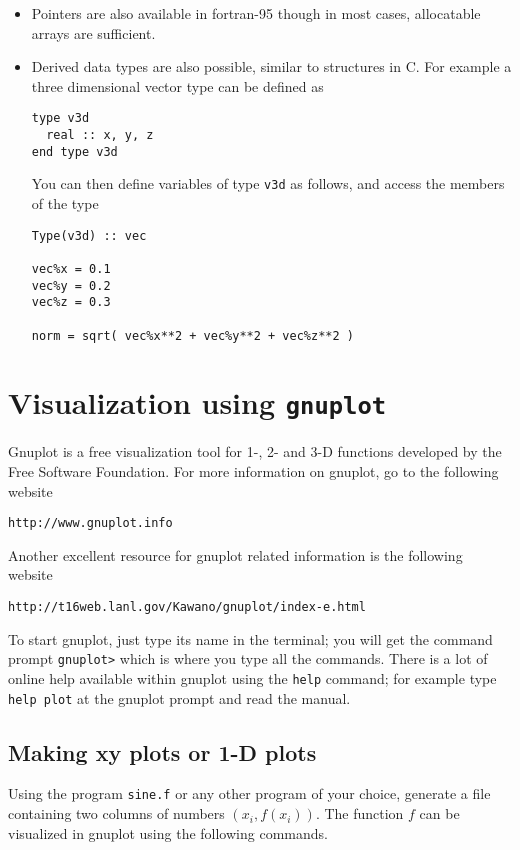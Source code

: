 \documentclass[11pt,oneside]{amsart}
\begin{document}
\begin{itemize}
\item Pointers are also available in fortran-95 though in most cases, allocatable arrays are sufficient.

\item Derived data types are also possible, similar to structures in C. For example a three dimensional vector type can be defined as
\begin{verbatim}
type v3d
  real :: x, y, z
end type v3d
\end{verbatim}
You can then define variables of type {\tt v3d} as follows, and access the members of the type
\begin{verbatim}
Type(v3d) :: vec

vec%x = 0.1
vec%y = 0.2
vec%z = 0.3

norm = sqrt( vec%x**2 + vec%y**2 + vec%z**2 )
\end{verbatim}

\end{itemize}

\section{Visualization using {\tt gnuplot}}
\label{gnu}

Gnuplot is a free visualization tool for 1-, 2- and 3-D functions developed by the Free Software Foundation. For more information on gnuplot, go to the following website

\begin{center}
{\tt http://www.gnuplot.info}
\end{center}
Another excellent resource for gnuplot related information is the following website
\begin{center}
{\tt http://t16web.lanl.gov/Kawano/gnuplot/index-e.html}
\end{center}
To start gnuplot, just type its name in the terminal; you will get the command prompt {\tt gnuplot>} which is where you type all the commands. There is a lot of online help available within gnuplot using the {\tt help} command; for example type {\tt help plot} at the gnuplot prompt and read the manual.

\subsection{Making xy plots or 1-D plots}
Using the program {\tt sine.f} or any other program of your choice, generate a file containing two columns of numbers $(x_i, f(x_i))$. The function $f$ can be visualized in gnuplot using the following commands.
\end{document}
